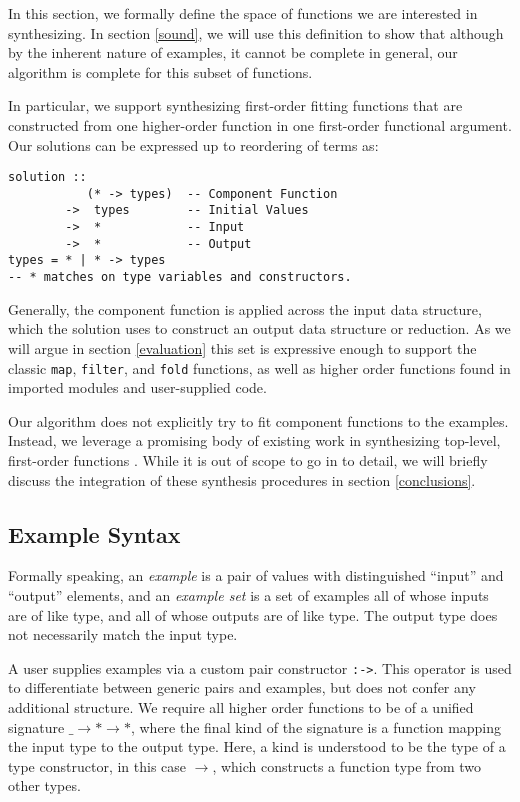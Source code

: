 In this section, we formally define the space of functions we are interested in synthesizing. In section \ref{sound}, we will use this definition to show that although by the inherent nature of examples, it cannot be complete in general, our algorithm is complete for this subset of functions.

In particular, we support synthesizing first-order fitting functions that are constructed from one higher-order function in one first-order functional argument. Our solutions can be expressed up to reordering of terms as:

\begin{lstlisting}
solution ::
           (* -> types)  -- Component Function
        ->  types        -- Initial Values
        ->  *            -- Input
        ->  *            -- Output
types = * | * -> types
-- * matches on type variables and constructors.
\end{lstlisting}

Generally, the component function is applied across the \textsf{input} data structure, which the \textsf{solution} uses to construct an \textsf{output} data structure or reduction. As we will argue in section \ref{evaluation} this set is expressive enough to support the classic \texttt{map}, \texttt{filter}, and \texttt{fold} functions, as well as higher order functions found in imported modules and user-supplied code.

Our algorithm does not explicitly try to fit component functions to the examples. Instead, we leverage a promising body of existing work in synthesizing top-level, first-order functions \cite{potential, reviewers}. While it is out of scope to go in to detail, we will briefly discuss the integration of these synthesis procedures in section \ref{conclusions}.

\subsection{Example Syntax}\label{exampleSyntax}
Formally speaking, an \textit{example} is a pair of values with distinguished ``input'' and ``output'' elements, and an \textit{example set} is a set of examples all of whose inputs are of like type, and all of whose outputs are of like type. The output type does not necessarily match the input type.

A user supplies examples via a custom pair constructor \texttt{:->}. This operator is used to differentiate between generic pairs and examples, but does not confer any additional structure. We require all higher order functions to be of a unified signature \texttt{$\_ \to * \to *$}, where the final kind of the signature is a function mapping the input type to the output type. Here, a kind is understood to be the type of a type constructor, in this case \texttt{$\to$}, which constructs a function type from two other types.

